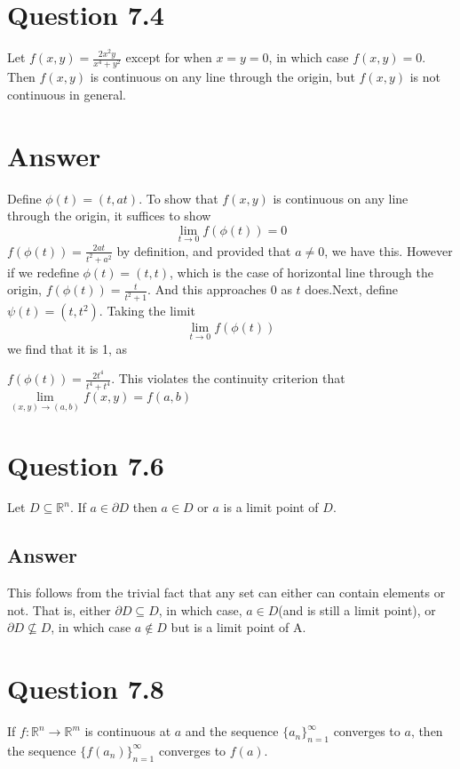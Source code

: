 \documentclass[
	12pt, %
]{fphw}
\begin{document}
\section*{Question 7.4}
\begin{problem}
	Let $f(x,y)=\frac{2x^2y}{x^4+y^2}$ except for when $x=y=0$, in which case $f(x,y)=0$. 
	Then $f(x,y)$ is continuous on any line through the origin, but $f(x,y)$ is not continuous in general. 
	
\end{problem}
\section*{Answer}
Define $\phi(t)=(t,at)$. To show that $f(x,y)$ is continuous on any line through the origin, it suffices to show 
$$\lim\limits_{t \to 0}f(\phi(t))=0$$
$f(\phi(t))=\frac{2at}{t^2+a^2}$ by definition, and provided that $a\neq 0$, we have this. However if we redefine $\phi(t)=(t,t)$, which is the case of horizontal line through the origin, 
$f(\phi(t))=\frac{t}{t^2+1}$. 
And this approaches $0$ as $t$ does.Next, define $\psi(t)=(t,t^2)$. Taking the limit $$\lim\limits_{t \to 0}f(\phi(t))$$ we find that it is 1, as 

$f(\phi(t))=\frac{2t^4}{t^4+t^4}$. This violates the continuity criterion that $\lim\limits_{(x,y) \to (a,b)}f(x,y)=f(a,b)$
\section*{Question 7.6}
\begin{problem}
	Let $D \subseteq \mathbb{R}^n$. If $a \in \partial D$ then $a \in D$ or $a$ is a limit point of $D$. 
\end{problem}
\subsection*{Answer}
This follows from the trivial fact that any set can either can contain elements or not. That is, either $\partial D \subseteq D$, in which case, $a \in D$(and is still a limit point), or $\partial D \not\subseteq D $, in which case $a\not\in D$ but is a limit point of A. 
\section*{Question 7.8}
\begin{problem}
	If $f:\mathbb{R}^n \to \mathbb{R}^m$ is continuous at $a$ and the sequence $\{a_n\}_{n=1}^{\infty}$ converges to $a$, then the sequence $\{f(a_n)\}_{n=1}^{\infty}$ converges to $f(a)$. 
\end{problem}
\end{document}
